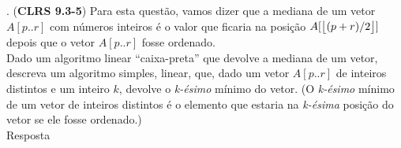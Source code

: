 . (\textbf{CLRS 9.3-5}) Para esta questão, vamos dizer que a mediana de um vetor $A[p..r]$ com números inteiros é o valor que ficaria na posição $A[\big\lfloor(p + r)/2\big\rfloor]$ depois que o vetor $A[p..r]$ fosse ordenado.\\
Dado um algoritmo linear “caixa-preta” que devolve a mediana de um vetor, descreva um algoritmo simples, linear, que, dado um vetor $A[p..r]$ de inteiros distintos e um inteiro $k$, devolve o \textit{k-ésimo} mínimo do vetor. (O \textit{k-ésimo} mínimo de um vetor de inteiros distintos é o elemento que estaria na \textit{k-ésima} posição do vetor se ele fosse ordenado.)\\[6pt]
Resposta\\